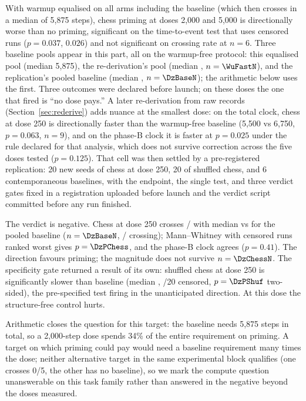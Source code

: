 \documentclass{article}
\begin{document}
With warmup equalised on all arms including the baseline (which then crosses in a median of
5{,}875 steps), chess priming at doses 2{,}000 and 5{,}000 is directionally worse than no
priming, significant on the time-to-event test that uses censored runs ($p=0.037$, $0.026$)
and not significant on crossing rate at $n=6$. Three baseline pools appear in this part,
all on the warmup-free protocol: this equalised pool (median 5{,}875), the re-derivation's
pool (median \WuFastMed, $n=\WuFastN$), and the replication's pooled baseline (median
\DzBaseMed, $n=\DzBaseN$); the arithmetic below uses the first. Three outcomes were declared before launch;
on these doses the one that fired is ``no dose pays.'' A later re-derivation from raw
records (Section~\ref{sec:rederive}) adds nuance at the smallest dose: on the total clock,
chess at dose 250 is directionally faster than the warmup-free baseline (5{,}500 vs
6{,}750, $p=0.063$, $n=9$), and on the phase-B clock it is faster at $p=0.025$ under the
rule declared for that analysis, which does not survive correction across the five doses
tested ($p=0.125$). That cell was then settled by a pre-registered replication: 20 new seeds
of chess at dose 250, 20 of shuffled chess, and 6 contemporaneous baselines, with the
endpoint, the single test, and three verdict gates fixed in a registration uploaded before
launch and the verdict script committed before any run finished.

The verdict is negative. Chess at dose 250 crosses \DzChessCross/\DzChessN{} with median
\DzChessMed{} vs \DzBaseMed{} for the pooled baseline ($n=\DzBaseN$, \DzBaseCross/\DzBaseN{}
crossing); Mann--Whitney with censored runs ranked worst gives $p=\DzPChess$, and the
phase-B clock agrees ($p=0.41$). The direction favours priming; the magnitude does not
survive $n=\DzChessN$. The specificity gate returned a result of its own: shuffled chess at
dose 250 is significantly slower than baseline (median \DzShufMed, \DzShufCens/20 censored,
$p=\DzPShuf$ two-sided), the pre-specified test firing in the unanticipated direction. At
this dose the structure-free control hurts.

Arithmetic closes the question for this target: the baseline needs 5{,}875 steps in total,
so a 2{,}000-step dose spends 34\% of the entire requirement on priming. A target on which
priming could pay would need a baseline requirement many times the dose; neither alternative
target in the same experimental block qualifies (one crosses 0/5, the other has no baseline), so we mark the
compute question unanswerable on this task family rather than answered in the negative
beyond the doses measured.
\end{document}
